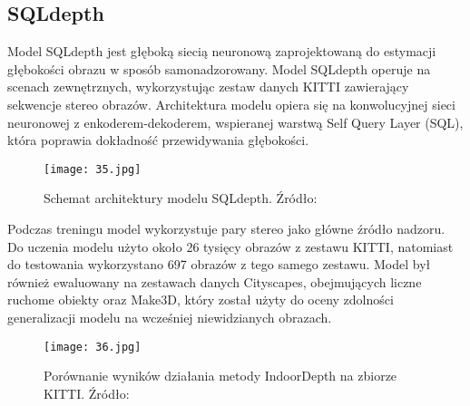 \subsection{SQLdepth}
Model SQLdepth \cite{wang2023sqldepth} jest głęboką siecią neuronową zaprojektowaną do estymacji głębokości obrazu w sposób samonadzorowany. Model SQLdepth operuje na scenach zewnętrznych, wykorzystując zestaw danych KITTI zawierający sekwencje stereo obrazów. Architektura modelu opiera się na konwolucyjnej sieci neuronowej z enkoderem-dekoderem, wspieranej warstwą Self Query Layer (SQL), która poprawia dokładność przewidywania głębokości.
\begin{figure}[H]
    \centering
    \texttt{[image: 35.jpg]}
    \caption{Schemat architektury modelu SQLdepth. Źródło: \cite{wang2023sqldepth}}
    \label{fig:sqldepth-architecture}
\end{figure}
Podczas treningu model wykorzystuje pary stereo jako główne źródło nadzoru. Do uczenia modelu użyto około 26 tysięcy obrazów z zestawu KITTI, natomiast do testowania wykorzystano 697 obrazów z tego samego zestawu. Model był również ewaluowany na zestawach danych Cityscapes, obejmujących liczne ruchome obiekty oraz Make3D, który został użyty do oceny zdolności generalizacji modelu na wcześniej niewidzianych obrazach.
\begin{figure}[H]
    \centering
    \texttt{[image: 36.jpg]}
    \caption{Porównanie wyników działania metody IndoorDepth na zbiorze KITTI. Źródło: \cite{wang2023sqldepth}}
    \label{fig:sqldepth-results}
\end{figure}


